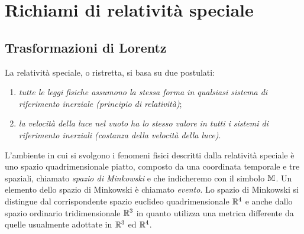\cleardoublepage
\chapter{Richiami di relatività speciale}
\label{cha:relativita-speciale}

\section{Trasformazioni di Lorentz}
\label{sec:trasformazioni-lorentz}

La relatività speciale, o ristretta, si basa su due postulati:
\begin{enumerate}
\item\emph{tutte le leggi fisiche assumono la stessa forma in qualsiasi sistema
    di riferimento inerziale (principio di
    relatività)};
\item \emph{la velocità della luce nel vuoto ha lo stesso valore in tutti i
    sistemi di riferimento inerziali (costanza della velocità della luce)}.
\end{enumerate}

L'ambiente in cui si svolgono i fenomeni fisici descritti dalla relatività
speciale è uno spazio quadrimensionale piatto, composto da una coordinata
temporale e tre spaziali, chiamato 
\emph{spazio di Minkowski} e che indicheremo con il simbolo $\mathbb{M}$.  Un elemento
dello spazio di Minkowski è chiamato \emph{evento}.  Lo spazio di
Minkowski si distingue dal corrispondente spazio euclideo quadrimensionale
$\mathbb{R}^{4}$ e anche dallo spazio ordinario tridimensionale $\mathbb{R}^{3}$ in quanto
utilizza una metrica differente da quelle usualmente adottate in $\mathbb{R}^{3}$ ed
$\mathbb{R}^{4}$.

